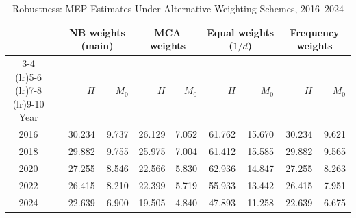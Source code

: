 \documentclass[11pt, a4paper]{article}
\begin{document}
\begin{table}[htb]
\centering
\caption{Robustness: MEP Estimates Under Alternative Weighting Schemes, 2016--2024}
\small
\begin{tabularx}{\textwidth}{c X rr rr rr rr}
\toprule
\toprule
& & \multicolumn{2}{c}{NB weights (main)} & \multicolumn{2}{c}{MCA weights} & \multicolumn{2}{c}{Equal weights ($1/d$)} & \multicolumn{2}{c}{Frequency weights} \\
\cmidrule(lr){3-4} \cmidrule(lr){5-6} \cmidrule(lr){7-8} \cmidrule(lr){9-10}
Year & & $H$ & $M_0$ & $H$ & $M_0$ & $H$ & $M_0$ & $H$ & $M_0$ \\ \midrule
2016 & & 30.234 & 9.737 & 26.129 & 7.052 & 61.762 & 15.670 & 30.234 & 9.621 \\
2018 & & 29.882 & 9.755 & 25.975 & 7.004 & 61.412 & 15.585 & 29.882 & 9.565 \\
2020 & & 27.255 & 8.546 & 22.566 & 5.830 & 62.936 & 14.847 & 27.255 & 8.263 \\
2022 & & 26.415 & 8.210 & 22.399 & 5.719 & 55.933 & 13.442 & 26.415 & 7.951 \\
2024 & & 22.639 & 6.900 & 19.505 & 4.840 & 47.893 & 11.258 & 22.639 & 6.675 \\
\bottomrule
\end{tabularx}
\begin{justify}
\scriptsize

\end{justify}
\end{table}
\end{document}
